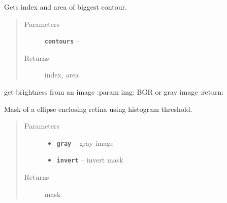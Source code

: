 \documentclass[letterpaper,10pt,english]{sphinxmanual}
\begin{document}

\begin{fulllineitems}
\label{RRtoolbox.lib.arrayops:RRtoolbox.lib.arrayops.mask.biggestCntData}
Gets index and area of biggest contour.
\begin{quote}\begin{description}
\item[{Parameters}] \leavevmode
\textbf{\texttt{contours}} -- 

\item[{Returns}] \leavevmode
index, area

\end{description}\end{quote}

\end{fulllineitems}


\begin{fulllineitems}
\label{RRtoolbox.lib.arrayops:RRtoolbox.lib.arrayops.mask.brightness}
get brightness from an image
:param img: BGR or gray image
:return:

\end{fulllineitems}


\begin{fulllineitems}
\label{RRtoolbox.lib.arrayops:RRtoolbox.lib.arrayops.mask.cnt_hist}
Mask of a ellipse enclosing retina using histogram threshold.
\begin{quote}\begin{description}
\item[{Parameters}] \leavevmode\begin{itemize}
\item {} 
\textbf{\texttt{gray}} -- gray image

\item {} 
\textbf{\texttt{invert}} -- invert mask

\end{itemize}

\item[{Returns}] \leavevmode
mask

\end{description}\end{quote}

\end{fulllineitems}
\end{document}
